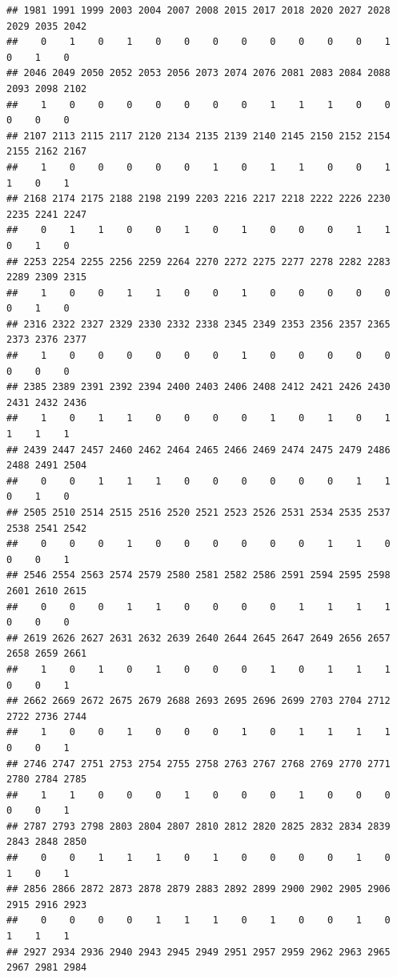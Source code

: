 \documentclass[
]{article}
\begin{document}
\begin{verbatim}
## 1981 1991 1999 2003 2004 2007 2008 2015 2017 2018 2020 2027 2028 2029 2035 2042 
##    0    1    0    1    0    0    0    0    0    0    0    0    1    0    1    0 
## 2046 2049 2050 2052 2053 2056 2073 2074 2076 2081 2083 2084 2088 2093 2098 2102 
##    1    0    0    0    0    0    0    0    1    1    1    0    0    0    0    0 
## 2107 2113 2115 2117 2120 2134 2135 2139 2140 2145 2150 2152 2154 2155 2162 2167 
##    1    0    0    0    0    0    1    0    1    1    0    0    1    1    0    1 
## 2168 2174 2175 2188 2198 2199 2203 2216 2217 2218 2222 2226 2230 2235 2241 2247 
##    0    1    1    0    0    1    0    1    0    0    0    1    1    0    1    0 
## 2253 2254 2255 2256 2259 2264 2270 2272 2275 2277 2278 2282 2283 2289 2309 2315 
##    1    0    0    1    1    0    0    1    0    0    0    0    0    0    1    0 
## 2316 2322 2327 2329 2330 2332 2338 2345 2349 2353 2356 2357 2365 2373 2376 2377 
##    1    0    0    0    0    0    0    1    0    0    0    0    0    0    0    0 
## 2385 2389 2391 2392 2394 2400 2403 2406 2408 2412 2421 2426 2430 2431 2432 2436 
##    1    0    1    1    0    0    0    0    1    0    1    0    1    1    1    1 
## 2439 2447 2457 2460 2462 2464 2465 2466 2469 2474 2475 2479 2486 2488 2491 2504 
##    0    0    1    1    1    0    0    0    0    0    0    1    1    0    1    0 
## 2505 2510 2514 2515 2516 2520 2521 2523 2526 2531 2534 2535 2537 2538 2541 2542 
##    0    0    0    1    0    0    0    0    0    0    1    1    0    0    0    1 
## 2546 2554 2563 2574 2579 2580 2581 2582 2586 2591 2594 2595 2598 2601 2610 2615 
##    0    0    0    1    1    0    0    0    0    1    1    1    1    0    0    0 
## 2619 2626 2627 2631 2632 2639 2640 2644 2645 2647 2649 2656 2657 2658 2659 2661 
##    1    0    1    0    1    0    0    0    1    0    1    1    1    0    0    1 
## 2662 2669 2672 2675 2679 2688 2693 2695 2696 2699 2703 2704 2712 2722 2736 2744 
##    1    0    0    1    0    0    0    1    0    1    1    1    1    0    0    1 
## 2746 2747 2751 2753 2754 2755 2758 2763 2767 2768 2769 2770 2771 2780 2784 2785 
##    1    1    0    0    0    1    0    0    0    1    0    0    0    0    0    1 
## 2787 2793 2798 2803 2804 2807 2810 2812 2820 2825 2832 2834 2839 2843 2848 2850 
##    0    0    1    1    1    0    1    0    0    0    0    1    0    1    0    1 
## 2856 2866 2872 2873 2878 2879 2883 2892 2899 2900 2902 2905 2906 2915 2916 2923 
##    0    0    0    0    1    1    1    0    1    0    0    1    0    1    1    1 
## 2927 2934 2936 2940 2943 2945 2949 2951 2957 2959 2962 2963 2965 2967 2981 2984 

\end{verbatim}
\end{document}
